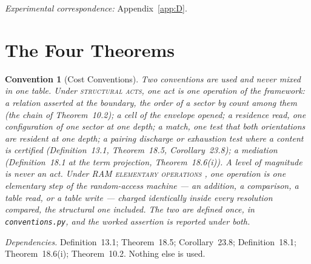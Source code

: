 \documentclass[pdflatex,sn-mathphys-num]{sn-jnl}
\theoremstyle{thmstyleone}%
\newtheorem{convention}[theorem]{Convention}
\theoremstyle{thmstyletwo}%
\theoremstyle{thmstylethree}%
\newtheorem{convention}[theorem]{Convention}
\newcommand{\deps}[1]{\par\begin{sloppypar}\noindent\emph{Dependencies.} #1 Nothing else is used.\end{sloppypar}}
\begin{document}
\noindent\emph{Experimental correspondence:} Appendix~\ref{app:D}.

\section{The Four Theorems}\label{sec:theorems}

\begin{convention}[Cost Conventions]\label{conv:cost}
Two conventions are used and never mixed in one table. Under \textsc{structural acts}, one act is one operation of the framework: a relation asserted at the boundary, the order of a sector by count among them (the chain of Theorem~10.2); a cell of the envelope opened; a residence read, one configuration of one sector at one depth; a match, one test that both orientations are resident at one depth; a pairing discharge or exhaustion test where a content is certified (Definition~13.1, Theorem~18.5, Corollary~23.8); a mediation (Definition~18.1 at the term projection, Theorem~18.6(i)). A level of magnitude is never an act. Under \textsc{RAM elementary operations} \citep{CookReckhow1973}, one operation is one elementary step of the random-access machine --- an addition, a comparison, a table read, or a table write --- charged identically inside every resolution compared, the structural one included. The two are defined once, in \texttt{conventions.py}, and the worked assertion is reported under both.
\end{convention}
\deps{Definition~13.1; Theorem~18.5; Corollary~23.8; Definition~18.1; Theorem~18.6(i); Theorem~10.2.}
\end{document}
